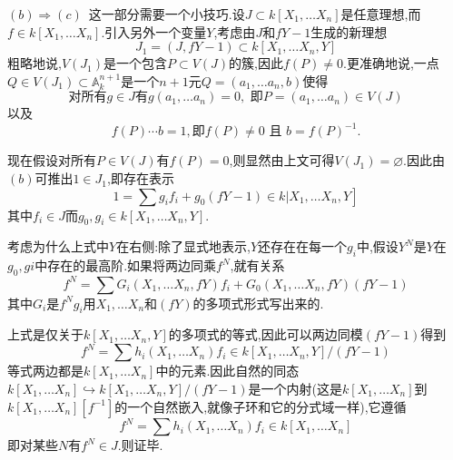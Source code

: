 \documentclass[UTF8]{book}
\begin{document}
		
		$ (b)  \Rightarrow (c) $\ 这一部分需要一个小技巧.设$J \subset k \left[ X _{1}, \ldots X _{ n }\right]$是任意理想,而$f \in k \left[ X _{1}, \ldots X _{ n }\right]$.引入另外一个变量$ Y $,考虑由$ J $和$ fY - 1 $生成的新理想
		\begin{equation*}
		J _{1}=(J , f Y -1) \subset k \left[ X _{1}, \ldots X _{ n }, Y \right]
		\end{equation*}
		粗略地说,$ V(J_{1}) $是一个包含$ P \subset V(J) $的簇,因此$ f(P) \neq 0 $.更准确地说,一点$Q \in V\left(J_{1}\right) \subset \mathbb{A}^{n+1}_{k}$是一个$ n +1 $元$Q =\left(a _{1}, \ldots a _{ n },b \right)$使得
		\begin{equation*}
		\text {对所有} g \in J \text{有}g\left(a_{1}, \dots a_{n}\right)=0 , \text { 即} P=\left(a_{1}, \dots a_{n}\right) \in V(J)
		\end{equation*}
		以及
		\begin{equation*}
		f(P) \cdots b=1, \text {即} f(P) \neq 0 \text { 且 } b=f(P)^{-1}.
		\end{equation*}
		
		
		现在假设对所有$ P \in V(J) $有$ f(P) = 0 $,则显然由上文可得$ V(J_{1}) = \varnothing $.因此由$ (b) $可推出$ 1 \in J_{1}$,即存在表示
		\begin{equation*}
		\left.1=\sum g_{i} f_{i}+g_{0}(f Y-1) \in k | X_{1}, \ldots X_{n}, Y\right]
		\end{equation*}
		其中$ f_{i} \in J $而$ g_{0},g_{i} \in k \left[ X _{1}, \ldots X _{ n }, Y \right] $.
		
		
		考虑为什么上式中$ Y $在右侧:除了显式地表示,$ Y $还存在在每一个$ g_{i} $中,假设$ Y^{N} $是$ Y $在$ g_{0},g{i} $中存在的最高阶.如果将两边同乘$ f^{N} $,就有关系
		\begin{equation*}
		f ^{ N }=\sum G _{ i }\left(X _{1}, \ldots X _{ n }, f Y \right) f _{ i }+ G _{0}\left(X _{1}, \ldots X _{ n }, fY \right)(fY -1)
		\end{equation*}
		其中$ G_{i} $是$ f^{N}g_{i} $用$ X _{1}, \ldots X _{ n } $和$ (fY) $的多项式形式写出来的.
		
		
		上式是仅关于$ k \left[ X _{1}, \ldots X _{ n }, Y \right] $的多项式的等式,因此可以两边同模$ (fY -1) $得到
		\begin{equation*}
		f ^{ N }=\sum h _{ i }\left(X _{1}, \ldots X _{ n }\right) f _{ i } \in k \left[ X_{1}, \ldots X _{ n }, Y \right] /(f Y -1)
		\end{equation*}
		等式两边都是$ k \left[ X _{1}, \ldots X _{ n }\right] $中的元素.因此自然的同态$ k \left[ X _{1}, \ldots X _{ n }\right] \hookrightarrow k \left[ X _{1}, \ldots X _{ n }, Y \right] /(f Y -1)$是一个内射(这是$ k \left[ X _{1}, \ldots X _{ n }\right] $到$ k \left[ X _{1}, \ldots X _{ n }\right][f^{-1}] $的一个自然嵌入,就像子环和它的分式域一样),它遵循
		\begin{equation*}
		f ^{ N }=\sum h _{ i }\left(X _{1}, \ldots X _{ n }\right) f _{ i } \in k \left[ X _{1}, \ldots X _{ n }\right]
		\end{equation*}
		即对某些$ N $有$ f^{N} \in J $.则证毕.
		
\end{document}
